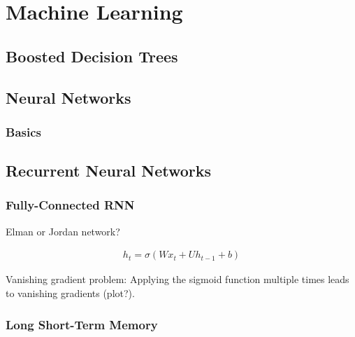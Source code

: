\chapter{Machine Learning}
\label{sec:ml}

\section{Boosted Decision Trees}
\label{sec:bdt}

\section{Neural Networks}
\label{sec:nn}

\subsection{Basics}
\label{sec:nn_basics}

\section{Recurrent Neural Networks}
\label{sec:rnn}

\subsection{Fully-Connected RNN}
\label{sec:fully_connected_rnn}

Elman or Jordan network?

\begin{align}
  h_t = \sigma(W x_t + U h_{t-1} + b)
\end{align}

Vanishing gradient problem: Applying the sigmoid function multiple times leads
to vanishing gradients (plot?).

\subsection{Long Short-Term Memory}
\label{sec:lstm}

